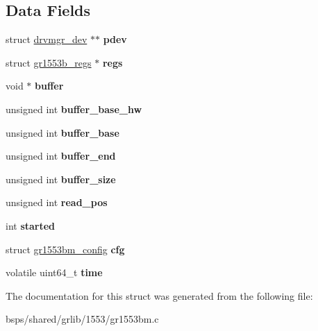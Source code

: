 \subsection*{Data Fields}
\begin{DoxyCompactItemize}
\item 
\mbox{\label{structgr1553bm__priv_af85f2632b96794b46047aec8b0028850}} 
struct \mbox{\hyperlink{structdrvmgr__dev}{drvmgr\+\_\+dev}} $\ast$$\ast$ {\bfseries pdev}
\item 
\mbox{\label{structgr1553bm__priv_a58cfd4d24c391e5c6b3c2a01ec2abd65}} 
struct \mbox{\hyperlink{structgr1553b__regs}{gr1553b\+\_\+regs}} $\ast$ {\bfseries regs}
\item 
\mbox{\label{structgr1553bm__priv_ac426b81ffe3b6808e6a83f21f931cd4c}} 
void $\ast$ {\bfseries buffer}
\item 
\mbox{\label{structgr1553bm__priv_a58f665b750bd092a786b29183a75fffd}} 
unsigned int {\bfseries buffer\+\_\+base\+\_\+hw}
\item 
\mbox{\label{structgr1553bm__priv_a2c5920a19d2b9e2a3b9ee62029a5cc93}} 
unsigned int {\bfseries buffer\+\_\+base}
\item 
\mbox{\label{structgr1553bm__priv_a04633833e7c8715e7fe5a47283e5d388}} 
unsigned int {\bfseries buffer\+\_\+end}
\item 
\mbox{\label{structgr1553bm__priv_a3a0aad8f06df6e193ca0f4f29c29d430}} 
unsigned int {\bfseries buffer\+\_\+size}
\item 
\mbox{\label{structgr1553bm__priv_afbf60e61b16774980a92082215996d21}} 
unsigned int {\bfseries read\+\_\+pos}
\item 
\mbox{\label{structgr1553bm__priv_a5855af5e009691a4e6cb771463c657f4}} 
int {\bfseries started}
\item 
\mbox{\label{structgr1553bm__priv_a1f2ce02c978f861c9f6ae7e6b135e4c9}} 
struct \mbox{\hyperlink{structgr1553bm__config}{gr1553bm\+\_\+config}} {\bfseries cfg}
\item 
\mbox{\label{structgr1553bm__priv_a49b200a00276a97c4d5e061a3825df43}} 
volatile uint64\+\_\+t {\bfseries time}
\end{DoxyCompactItemize}


The documentation for this struct was generated from the following file\+:\begin{DoxyCompactItemize}
\item 
bsps/shared/grlib/1553/gr1553bm.\+c\end{DoxyCompactItemize}
